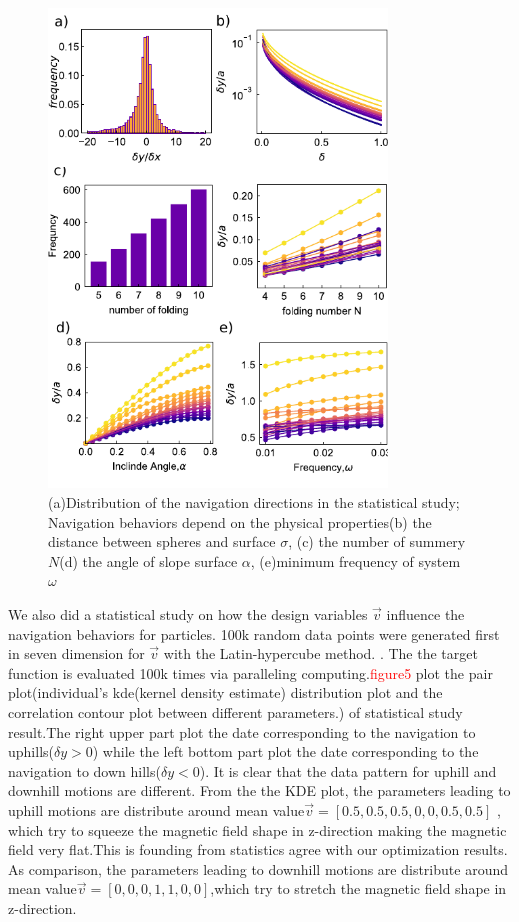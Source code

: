 \begin{figure}[p]
\centering
\includegraphics[width=9cm]{figures/5_5.pdf}
\caption{(a)Distribution of the navigation directions in the statistical study; Navigation behaviors depend on the physical properties(b) the distance between spheres and surface $\sigma$, (c) the number of summery $N$(d) the angle of slope surface $\alpha$, (e)minimum frequency of system  $\omega$ }
\label{fig:1}
\end{figure}


We also did a statistical study on how the design variables $\vec{v}$ influence the  navigation behaviors for particles. 100k random data points were generated first in seven dimension for $\vec{v}$ with the Latin-hypercube method.\cite{park1994optimal} . The the target function is evaluated 100k times via paralleling computing.\textcolor{red}{figure5} plot the pair plot(individual's kde(kernel density estimate) distribution plot and the correlation contour plot between different parameters.) of statistical study result.The right upper part plot the date corresponding to the navigation to uphills($\delta y>0$) while the left bottom part plot the date corresponding to the navigation to down hills($\delta y<0$). It is clear that the data pattern for uphill and downhill motions are different. From the the KDE plot, the parameters leading to uphill motions are distribute around mean value$\vec{v}=[0.5,0.5,0.5,0,0,0.5,0.5]$  , which try to squeeze the magnetic field shape in z-direction making the magnetic field  very flat.This is founding from statistics agree with our optimization results. As comparison, the parameters leading to downhill motions are distribute around mean value$\vec{v}=[0,0,0,1,1,0,0]$,which try to 
stretch the magnetic field shape in z-direction.
 
